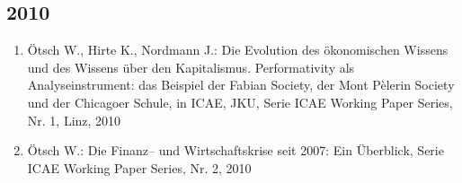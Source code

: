 \subsection*{2010}
\begin{enumerate}
    	 \item Ötsch W., Hirte K., Nordmann J.: Die Evolution des ökonomischen Wissens und des Wissens über den Kapitalismus. Performativity als Analyseinstrument: das Beispiel der Fabian Society, der Mont Pèlerin Society und der Chicagoer Schule, in ICAE, JKU, Serie ICAE Working Paper Series, Nr. 1, Linz, 2010
	 \item Ötsch W.: Die Finanz--­ und Wirtschaftskrise seit 2007: Ein Überblick, Serie ICAE Working Paper Series, Nr. 2, 2010
\end{enumerate}
